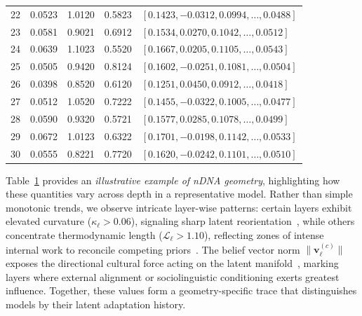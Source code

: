 \begin{table}[H]
\begin{tabular}{|c|c|c|c|l|}
22 & \cellcolor{yellow!20}0.0523 & \cellcolor{orange!30}1.0120 & \cellcolor{green!20}0.5823 & $[0.1423, -0.0312, 0.0994, \ldots, 0.0488]$ \\
23 & \cellcolor{orange!20}0.0581 & \cellcolor{yellow!20}0.9021 & \cellcolor{yellow!30}0.6912 & $[0.1534, 0.0270, 0.1042, \ldots, 0.0512]$ \\
24 & \cellcolor{red!20}0.0639 & \cellcolor{red!40}1.1023 & \cellcolor{green!15}0.5520 & $[0.1667, 0.0205, 0.1105, \ldots, 0.0543]$ \\
25 & \cellcolor{yellow!30}0.0505 & \cellcolor{orange!20}0.9420 & \cellcolor{red!40}0.8124 & $[0.1602, -0.0251, 0.1081, \ldots, 0.0504]$ \\
26 & \cellcolor{green!15}0.0398 & \cellcolor{green!20}0.8520 & \cellcolor{yellow!20}0.6120 & $[0.1251, 0.0450, 0.0912, \ldots, 0.0418]$ \\
27 & \cellcolor{yellow!20}0.0512 & \cellcolor{red!30}1.0520 & \cellcolor{orange!30}0.7222 & $[0.1455, -0.0322, 0.1005, \ldots, 0.0477]$ \\
28 & \cellcolor{orange!30}0.0590 & \cellcolor{yellow!30}0.9320 & \cellcolor{green!30}0.5721 & $[0.1577, 0.0285, 0.1078, \ldots, 0.0499]$ \\
29 & \cellcolor{red!30}0.0672 & \cellcolor{orange!30}1.0123 & \cellcolor{yellow!20}0.6322 & $[0.1701, -0.0198, 0.1142, \ldots, 0.0533]$ \\
30 & \cellcolor{orange!20}0.0555 & \cellcolor{green!15}0.8221 & \cellcolor{red!20}0.7720 & $[0.1620, -0.0242, 0.1101, \ldots, 0.0510]$ \\
\hline
\end{tabular}
\label{tab:ndna_example}
\end{table}








\clearpage














\noindent
Table~\ref{tab:ndna_example} provides an \emph{illustrative example of nDNA geometry}, highlighting how these quantities vary across depth in a representative model. 
Rather than simple monotonic trends, we observe intricate layer-wise patterns: certain layers exhibit elevated curvature ($\kappa_\ell > 0.06$), signaling sharp latent reorientation~\citep{cho2023mixedcurvature}, while others concentrate thermodynamic length ($\mathcal{L}_\ell > 1.10$), reflecting zones of intense internal work to reconcile competing priors~\citep{crooks2007measuring, oliviero2023thermodynamics}. 
The belief vector norm $\| \mathbf{v}_\ell^{(c)} \|$ exposes the directional cultural force acting on the latent manifold~\citep{peng2024cultural, zhou2023alignmentdrift}, marking layers where external alignment or sociolinguistic conditioning exerts greatest influence. 
Together, these values form a geometry-specific trace that distinguishes models by their latent adaptation history.



